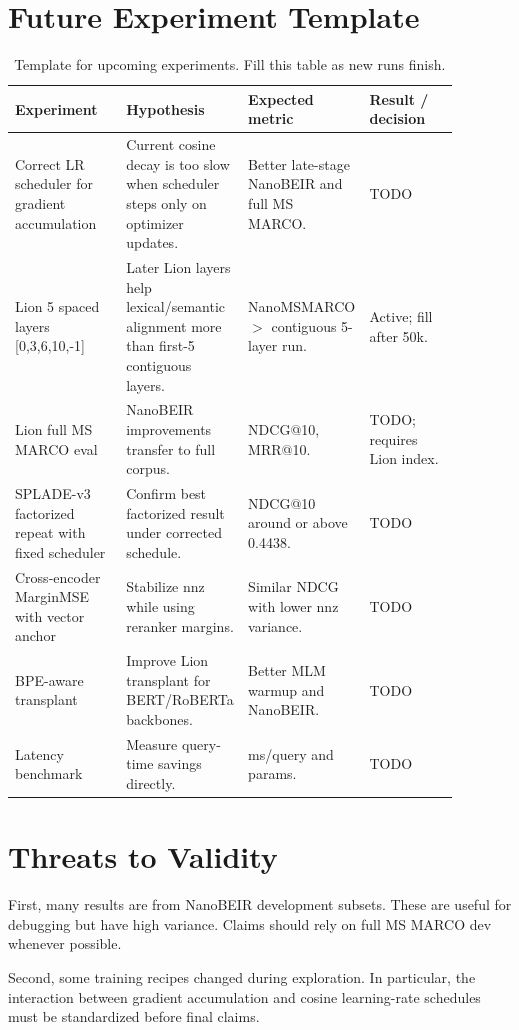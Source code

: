 \documentclass[
]{ceurart}
\begin{document}
\section{Future Experiment Template}

\begin{table}[t]
\caption{Template for upcoming experiments. Fill this table as new runs finish.}
\label{tab:future}
\centering
\begin{tabular}{p{0.25\linewidth}p{0.25\linewidth}p{0.18\linewidth}p{0.20\linewidth}}
\toprule
Experiment & Hypothesis & Expected metric & Result / decision \\
\midrule
Correct LR scheduler for gradient accumulation & Current cosine decay is too slow when scheduler steps only on optimizer updates. & Better late-stage NanoBEIR and full MS MARCO. & TODO \\
Lion 5 spaced layers [0,3,6,10,-1] & Later Lion layers help lexical/semantic alignment more than first-5 contiguous layers. & NanoMSMARCO $>$ contiguous 5-layer run. & Active; fill after 50k. \\
Lion full MS MARCO eval & NanoBEIR improvements transfer to full corpus. & NDCG@10, MRR@10. & TODO; requires Lion index. \\
SPLADE-v3 factorized repeat with fixed scheduler & Confirm best factorized result under corrected schedule. & NDCG@10 around or above 0.4438. & TODO \\
Cross-encoder MarginMSE with vector anchor & Stabilize nnz while using reranker margins. & Similar NDCG with lower nnz variance. & TODO \\
BPE-aware transplant & Improve Lion transplant for BERT/RoBERTa backbones. & Better MLM warmup and NanoBEIR. & TODO \\
Latency benchmark & Measure query-time savings directly. & ms/query and params. & TODO \\
\bottomrule
\end{tabular}
\end{table}

\section{Threats to Validity}

First, many results are from NanoBEIR development subsets. These are useful for
debugging but have high variance. Claims should rely on full MS MARCO dev
whenever possible.

Second, some training recipes changed during exploration. In particular, the
interaction between gradient accumulation and cosine learning-rate schedules
must be standardized before final claims.
\end{document}
